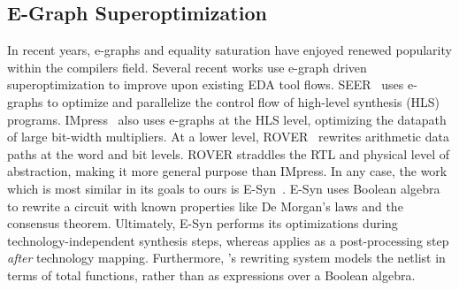 \subsection{E-Graph Superoptimization}\label{sec:relatedwork:egraph}
In recent years, e-graphs and equality saturation have enjoyed renewed
popularity within the compilers field. Several recent works use e-graph driven
superoptimization to improve upon existing EDA tool flows. SEER~\cite{seer}
uses e-graphs to optimize and parallelize the control flow of high-level
synthesis (HLS) programs. IMpress~\cite{impress} also uses e-graphs at the HLS
level, optimizing the datapath of large bit-width multipliers. At a lower
level, ROVER~\cite{rover,roverbl,egraphconstraints} rewrites arithmetic data
paths at the word and bit levels. ROVER straddles the RTL and physical level of
abstraction, making it more general purpose than IMpress. In any case, the work
which is most similar in its goals to ours is E-Syn~\cite{esynth}. E-Syn uses
Boolean algebra to rewrite a circuit with known properties like De Morgan's
laws and the consensus theorem. Ultimately, E-Syn performs its optimizations
during technology-independent synthesis steps, whereas \shortname{} applies as
a post-processing step \textit{after} technology mapping. Furthermore,
\shortname{}'s rewriting system models the netlist in terms of total functions,
rather than as expressions over a Boolean algebra.